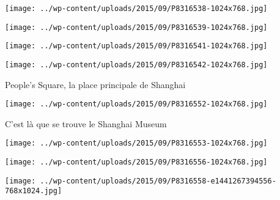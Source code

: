  

 

\begin{center} \texttt{[image: ../wp-content/uploads/2015/09/P8316538-1024x768.jpg]} \end{center}

 

 

\begin{center} \texttt{[image: ../wp-content/uploads/2015/09/P8316539-1024x768.jpg]} \end{center}

 

 

\begin{center} \texttt{[image: ../wp-content/uploads/2015/09/P8316541-1024x768.jpg]} \end{center}

 

 

\begin{center} \texttt{[image: ../wp-content/uploads/2015/09/P8316542-1024x768.jpg]} \end{center}

 

 People's Square, la place principale de Shanghai 

 

\begin{center} \texttt{[image: ../wp-content/uploads/2015/09/P8316552-1024x768.jpg]} \end{center}

 

 C'est là que se trouve le Shanghai Museum 

 

\begin{center} \texttt{[image: ../wp-content/uploads/2015/09/P8316553-1024x768.jpg]} \end{center}

 

 

\begin{center} \texttt{[image: ../wp-content/uploads/2015/09/P8316556-1024x768.jpg]} \end{center}

 

 

\begin{center} \texttt{[image: ../wp-content/uploads/2015/09/P8316558-e1441267394556-768x1024.jpg]} \end{center}

